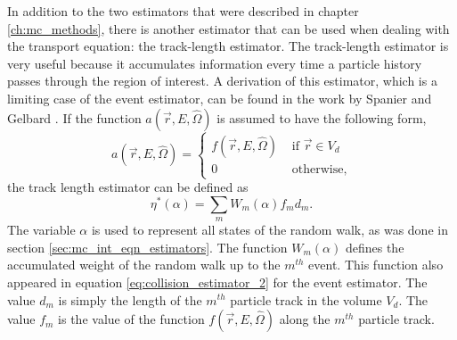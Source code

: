 In addition to the two estimators that were described in chapter 
\ref{ch:mc_methods}, there is another estimator that can be used when dealing
with the transport equation: the track-length estimator. The track-length 
estimator is very useful because it accumulates information every time a 
particle history passes through the region of interest. A derivation of this 
estimator, which is a limiting case of the event estimator, can be found in the 
work by Spanier and Gelbard \citep{spanier_monte_1969}. If the function 
$a(\vec{r},E,\hat{\Omega})$ is assumed to have the following form, 
\begin{equation*}
  a(\vec{r},E,\hat{\Omega}) = 
  \begin{cases}
    f(\vec{r},E,\hat{\Omega}) & \text{ if } \vec{r} \in V_d \\
    0 & \text{ otherwise}, 
  \end{cases}
\end{equation*}
the track length estimator can be defined as 
\begin{equation}
  \eta^{*}(\alpha) = \sum_m W_m(\alpha)f_md_m.
\end{equation}
The variable $\alpha$ is used to represent all states of the random walk,
as was done in section \ref{sec:mc_int_eqn_estimators}. The function
$W_m(\alpha)$ defines the accumulated weight of the random walk up to the 
$m^{th}$ event. This function also appeared in equation 
\ref{eq:collision_estimator_2} for the event estimator. The value $d_m$ is 
simply the length of the $m^{th}$ particle track in the volume $V_d$. The value 
$f_m$ is the value of the function $f(\vec{r},E,\hat{\Omega})$ along the 
$m^{th}$ particle track. 


